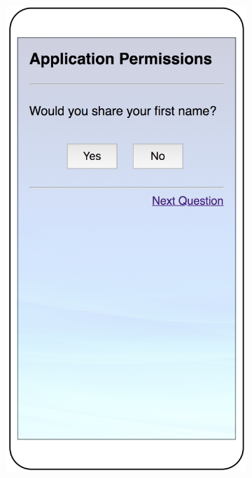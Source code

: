 %	
\begin{figure}
	\centering
	\begin{subfigure}[b]{0.24\textheight}
		\includegraphics[width=0.24\textheight]{figures/direct1.png}

\end{subfigure}
\end{figure}
